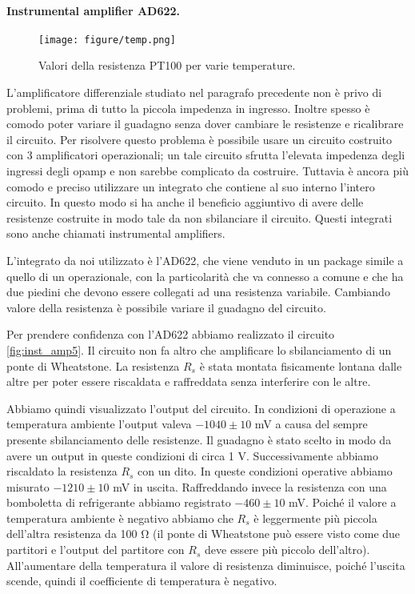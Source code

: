 \paragraph{Instrumental amplifier AD622.}

\begin{figure*}[t]
    \texttt{[image: figure/temp.png]}
    \caption{Valori della resistenza PT100 per varie temperature.}
    \label{fig:temp5}
\end{figure*}

L'amplificatore differenziale studiato nel paragrafo precedente non è privo di problemi, prima di tutto la piccola impedenza
in ingresso. Inoltre spesso è comodo poter variare il guadagno senza dover cambiare le resistenze e ricalibrare il circuito.
Per risolvere questo problema è possibile usare un circuito costruito con 3 amplificatori operazionali; un tale circuito sfrutta
l'elevata impedenza degli ingressi degli opamp e non sarebbe complicato da costruire. Tuttavia è ancora più comodo e preciso
utilizzare un integrato che contiene al suo interno l'intero circuito. In questo modo si ha anche il beneficio aggiuntivo di avere
delle resistenze costruite in modo tale da non sbilanciare il circuito. Questi integrati sono anche chiamati instrumental amplifiers.

L'integrato da noi utilizzato è l'AD622, che viene venduto in un package simile a quello di un operazionale,
con la particolarità che va connesso a comune e che ha due piedini che devono essere collegati ad una resistenza
variabile. Cambiando valore della resistenza è possibile variare il guadagno del circuito.

Per prendere confidenza con l'AD622 abbiamo realizzato il circuito \ref{fig:inst_amp5}. Il circuito non fa altro che
amplificare lo sbilanciamento di un ponte di Wheatstone. La resistenza $R_s$ è stata montata fisicamente lontana
dalle altre per poter essere riscaldata e raffreddata senza interferire con le altre.

Abbiamo quindi visualizzato l'output del circuito. In condizioni di operazione a temperatura ambiente l'output valeva
$- 1040 \pm 10$ mV a causa del sempre presente sbilanciamento delle resistenze. Il guadagno è stato scelto in modo 
 da avere un output in queste condizioni di circa 1 V. Successivamente abbiamo riscaldato la resistenza $R_s$
con un dito. In queste condizioni operative abbiamo misurato $- 1210 \pm 10$ mV in uscita. Raffreddando invece la resistenza
con una bomboletta di refrigerante abbiamo registrato $-460 \pm 10$ mV. Poiché il valore a temperatura ambiente
è negativo abbiamo che $R_s$ è leggermente più piccola dell'altra resistenza da 100 \si{\ohm} (il ponte di Wheatstone
può essere visto come due partitori e l'output del partitore con $R_s$ deve essere più piccolo dell'altro).
All'aumentare della temperatura il valore di resistenza diminuisce, poiché
l'uscita scende, quindi il coefficiente di temperatura è negativo.

